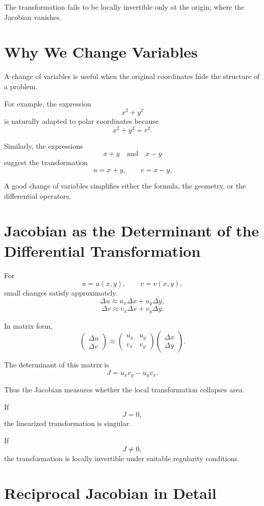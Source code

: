 \documentclass[11pt,oneside]{book}
\theoremstyle{studentthm}
\theoremstyle{definition}
\begin{document}
The transformation fails to be locally invertible only at the origin,
where the Jacobian vanishes.



\section{Why We Change Variables}

A change of variables is useful when the original coordinates hide the
structure of a problem.

For example, the expression
\[
x^2+y^2
\]
is naturally adapted to polar coordinates because
\[
x^2+y^2=r^2.
\]

Similarly, the expressions
\[
x+y
\quad\text{and}\quad
x-y
\]
suggest the transformation
\[
u=x+y,\qquad v=x-y.
\]

A good change of variables simplifies either the formula, the geometry,
or the differential operators.

\section{Jacobian as the Determinant of the Differential Transformation}

For
\[
u=u(x,y),
\qquad
v=v(x,y),
\]
small changes satisfy approximately
\[
\Delta u
\approx
u_x\Delta x+u_y\Delta y,
\]
\[
\Delta v
\approx
v_x\Delta x+v_y\Delta y.
\]

In matrix form,
\[
\begin{pmatrix}
\Delta u\\
\Delta v
\end{pmatrix}
\approx
\begin{pmatrix}
u_x&u_y\\
v_x&v_y
\end{pmatrix}
\begin{pmatrix}
\Delta x\\
\Delta y
\end{pmatrix}.
\]

The determinant of this matrix is
\[
J
=
u_xv_y-u_yv_x.
\]

Thus the Jacobian measures whether the local transformation collapses
area.

If
\[
J=0,
\]
the linearized transformation is singular.

If
\[
J\ne0,
\]
the transformation is locally invertible under suitable regularity
conditions.

\section{Reciprocal Jacobian in Detail}
\end{document}
